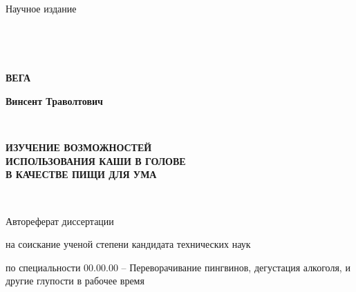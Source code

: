 
\newpage

\begin{titlepage}
~
\begin{center}

\vspace{60mm}
Научное издание

~

~

\textbf{ВЕГА}

\textbf{Винсент Траволтович}

~

\textbf{ИЗУЧЕНИЕ ВОЗМОЖНОСТЕЙ\\ИСПОЛЬЗОВАНИЯ КАШИ В ГОЛОВЕ\\В КАЧЕСТВЕ ПИЩИ ДЛЯ УМА}

~

Автореферат диссертации

на соискание ученой степени кандидата технических наук

по специальности 00.00.00 – Переворачивание пингвинов, дегустация алкоголя, и другие глупости в рабочее время


\vspace{30mm}




\end{center}
\end{titlepage}